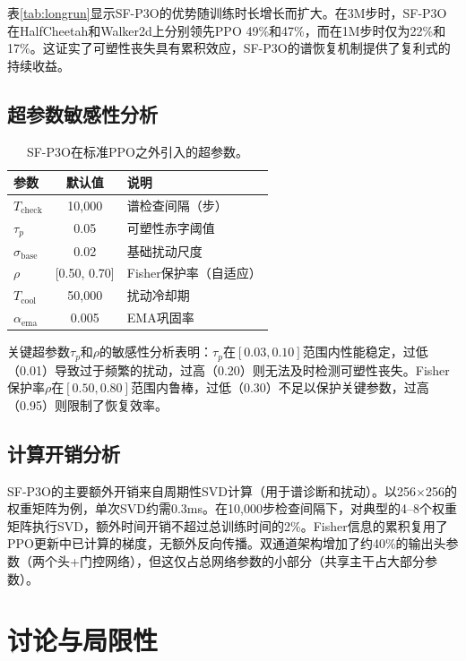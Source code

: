\documentclass[twocolumn]{article}
\begin{document}
表\ref{tab:longrun}显示SF-P3O的优势随训练时长增长而扩大。在3M步时，SF-P3O在HalfCheetah和Walker2d上分别领先PPO 49\%和47\%，而在1M步时仅为22\%和17\%。这证实了可塑性丧失具有累积效应，SF-P3O的谱恢复机制提供了复利式的持续收益。


\subsection{超参数敏感性分析}
\label{sec:sensitivity}

\begin{table}[t]
\centering
\caption{SF-P3O在标准PPO之外引入的超参数。}
\label{tab:hyperparams}
\begin{tabular}{lcp{4cm}}
\toprule
\textbf{参数} & \textbf{默认值} & \textbf{说明} \\
\midrule
$T_{\text{check}}$ & 10,000 & 谱检查间隔（步） \\
$\tau_p$ & 0.05 & 可塑性赤字阈值 \\
$\sigma_{\text{base}}$ & 0.02 & 基础扰动尺度 \\
$\rho$ & [0.50, 0.70] & Fisher保护率（自适应） \\
$T_{\text{cool}}$ & 50,000 & 扰动冷却期 \\
$\alpha_{\text{ema}}$ & 0.005 & EMA巩固率 \\
\bottomrule
\end{tabular}
\end{table}

关键超参数$\tau_p$和$\rho$的敏感性分析表明：$\tau_p$在$[0.03, 0.10]$范围内性能稳定，过低（0.01）导致过于频繁的扰动，过高（0.20）则无法及时检测可塑性丧失。Fisher保护率$\rho$在$[0.50, 0.80]$范围内鲁棒，过低（0.30）不足以保护关键参数，过高（0.95）则限制了恢复效率。

\subsection{计算开销分析}

SF-P3O的主要额外开销来自周期性SVD计算（用于谱诊断和扰动）。以256$\times$256的权重矩阵为例，单次SVD约需0.3ms。在10,000步检查间隔下，对典型的4--8个权重矩阵执行SVD，额外时间开销不超过总训练时间的2\%。Fisher信息的累积复用了PPO更新中已计算的梯度，无额外反向传播。双通道架构增加了约40\%的输出头参数（两个头+门控网络），但这仅占总网络参数的小部分（共享主干占大部分参数）。


\section{讨论与局限性}
\label{sec:discussion}
\end{document}
